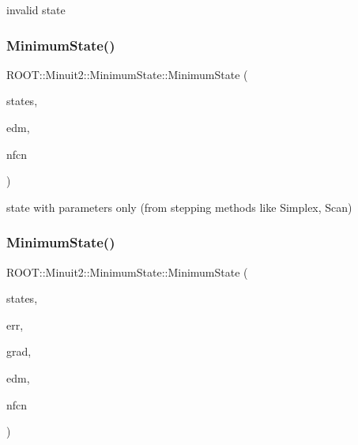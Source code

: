 invalid state \mbox{\label{classROOT_1_1Minuit2_1_1MinimumState_a602211ccc0379969a079ebf4de44421b}} 
\subsubsection{\texorpdfstring{MinimumState()}{MinimumState()}\hspace{0.1cm}{\footnotesize\ttfamily [2/12]}}
{\footnotesize\ttfamily R\+O\+O\+T\+::\+Minuit2\+::\+Minimum\+State\+::\+Minimum\+State (\begin{DoxyParamCaption}\item[{const \mbox{\hyperlink{classROOT_1_1Minuit2_1_1MinimumParameters}{Minimum\+Parameters}} \&}]{states,  }\item[{double}]{edm,  }\item[{int}]{nfcn }\end{DoxyParamCaption})\hspace{0.3cm}{\ttfamily [inline]}}

state with parameters only (from stepping methods like Simplex, Scan) \mbox{\label{classROOT_1_1Minuit2_1_1MinimumState_a35c2e0098d60a9caeee9e2c60093b5a9}} 
\subsubsection{\texorpdfstring{MinimumState()}{MinimumState()}\hspace{0.1cm}{\footnotesize\ttfamily [3/12]}}
{\footnotesize\ttfamily R\+O\+O\+T\+::\+Minuit2\+::\+Minimum\+State\+::\+Minimum\+State (\begin{DoxyParamCaption}\item[{const \mbox{\hyperlink{classROOT_1_1Minuit2_1_1MinimumParameters}{Minimum\+Parameters}} \&}]{states,  }\item[{const \mbox{\hyperlink{classROOT_1_1Minuit2_1_1MinimumError}{Minimum\+Error}} \&}]{err,  }\item[{const \mbox{\hyperlink{classROOT_1_1Minuit2_1_1FunctionGradient}{Function\+Gradient}} \&}]{grad,  }\item[{double}]{edm,  }\item[{int}]{nfcn }\end{DoxyParamCaption})\hspace{0.3cm}{\ttfamily [inline]}}

